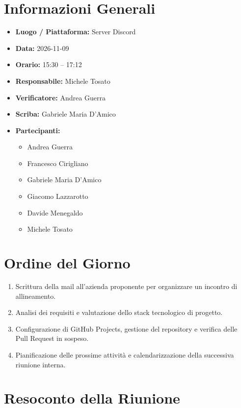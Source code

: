 \documentclass[11pt, a4paper]{article}
\newcommand{\DocDate}{2026-11-09}
\begin{document}
\section{Informazioni Generali}
\begin{itemize}
    \item \textbf{Luogo / Piattaforma:} Server Discord
    \item \textbf{Data:} \DocDate
    \item \textbf{Orario:} 15:30 -- 17:12
    \item \textbf{Responsabile:} Michele Tosato
    \item \textbf{Verificatore:} Andrea Guerra
    \item \textbf{Scriba:} Gabriele Maria D'Amico
    \item \textbf{Partecipanti:}
        \begin{itemize}
            \item Andrea Guerra
            \item Francesco Cirigliano
            \item Gabriele Maria D'Amico
            \item Giacomo Lazzarotto
            \item Davide Menegaldo
            \item Michele Tosato
        \end{itemize}
\end{itemize}
\clearpage


\section{Ordine del Giorno}
\begin{enumerate}
    \item Scrittura della mail all'azienda proponente per organizzare un incontro di allineamento.
    \item Analisi dei requisiti e valutazione dello stack tecnologico di progetto.
    \item Configurazione di GitHub Projects, gestione del repository e verifica delle Pull Request in sospeso.
    \item Pianificazione delle prossime attività e calendarizzazione della successiva riunione interna.
\end{enumerate}


\section{Resoconto della Riunione}
\end{document}
